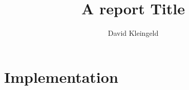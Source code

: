 \documentclass[lang=en, hanging-titles=true]{skrapport}
\title{A report Title}
\author[dskleingeld@gmail.com]{David Kleingeld}
\begin{document}
\maketitle
\tableofcontents

%
%
\section{Implementation}

%
%

\clearpage
\appendix
% 
\end{document}
